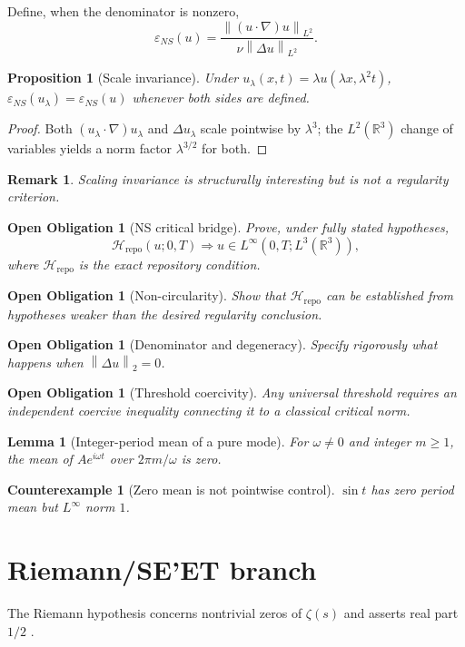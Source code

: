 \documentclass[11pt]{article}
\newtheorem{lemma}[theorem]{Lemma}
\newtheorem{proposition}[theorem]{Proposition}
\newtheorem{obligation}[theorem]{Open Obligation}
\newtheorem{counterexample}[theorem]{Counterexample}
\newtheorem{remark}[theorem]{Remark}
\newcommand{\R}{\mathbb{R}}
\newcommand{\eps}{\varepsilon}
\newcommand{\norm}[1]{\left\lVert #1\right\rVert}
\begin{document}
Define, when the denominator is nonzero,
\[
\eps_{NS}(u)=\frac{\norm{(u\cdot\nabla)u}_{L^2}}{\nu\norm{\Delta u}_{L^2}}.
\]

\begin{proposition}[Scale invariance]
Under $u_\lambda(x,t)=\lambda u(\lambda x,\lambda^2t)$, $\eps_{NS}(u_\lambda)=\eps_{NS}(u)$ whenever both sides are defined.
\end{proposition}
\begin{proof}Both $(u_\lambda\cdot\nabla)u_\lambda$ and $\Delta u_\lambda$ scale pointwise by $\lambda^3$; the $L^2(\R^3)$ change of variables yields a norm factor $\lambda^{3/2}$ for both.\end{proof}

\begin{remark}Scaling invariance is structurally interesting but is not a regularity criterion.\end{remark}

\begin{obligation}[NS critical bridge]
Prove, under fully stated hypotheses,
\[
\mathcal H_{\mathrm{repo}}(u;0,T)\Longrightarrow u\in L^\infty(0,T;L^3(\R^3)),
\]
where $\mathcal H_{\mathrm{repo}}$ is the exact repository condition.
\end{obligation}

\begin{obligation}[Non-circularity]Show that $\mathcal H_{\mathrm{repo}}$ can be established from hypotheses weaker than the desired regularity conclusion.\end{obligation}
\begin{obligation}[Denominator and degeneracy]Specify rigorously what happens when $\norm{\Delta u}_2=0$.\end{obligation}
\begin{obligation}[Threshold coercivity]Any universal threshold requires an independent coercive inequality connecting it to a classical critical norm.\end{obligation}

\begin{lemma}[Integer-period mean of a pure mode]
For $\omega\ne0$ and integer $m\ge1$, the mean of $Ae^{i\omega t}$ over $2\pi m/\omega$ is zero.
\end{lemma}
\begin{counterexample}[Zero mean is not pointwise control]$\sin t$ has zero period mean but $L^\infty$ norm $1$.\end{counterexample}

\section{Riemann/SE'ET branch}
The Riemann hypothesis concerns nontrivial zeros of $\zeta(s)$ and asserts real part $1/2$ \cite{Titchmarsh1986,Edwards1974,IwaniecKowalski2004,ClayRH}.
\end{document}
